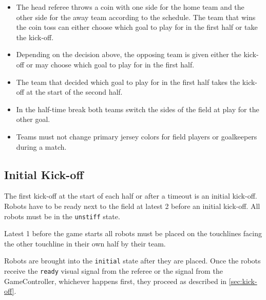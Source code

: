 \begin{itemize}
  \item The head referee throws a coin with one side for the home team and the other side for the away team according to the schedule.
    The team that wins the coin toss can either choose which goal to play for in the first half or take the kick-off.
  \item Depending on the decision above, the opposing team is given either the kick-off or may choose which goal to play for in the first half.
  \item The team that decided which goal to play for in the first half takes the kick-off at the start of the second half.
  \item In the half-time break both teams switch the sides of the field at play for the other goal.
  \item Teams must not change primary jersey colors for field players or goalkeepers during a match.
\end{itemize}

\subsection{Initial Kick-off}
\label{sec:initial-kick-off}

The first kick-off at the start of each half or after a timeout is an initial kick-off.
Robots have to be ready next to the field at latest \qty{2}{\min} before an initial kick-off.
All robots must be in the \texttt{unstiff} state.

Latest \qty{1}{\min} before the game starts all robots must be placed on the touchlines facing the other touchline in their own half by their team.

Robots are brought into the \texttt{initial} state after they are placed.
Once the robots receive the \texttt{ready} visual signal from the referee or the signal from the GameController, whichever happens first, they proceed as described in \cref{sec:kick-off}.


